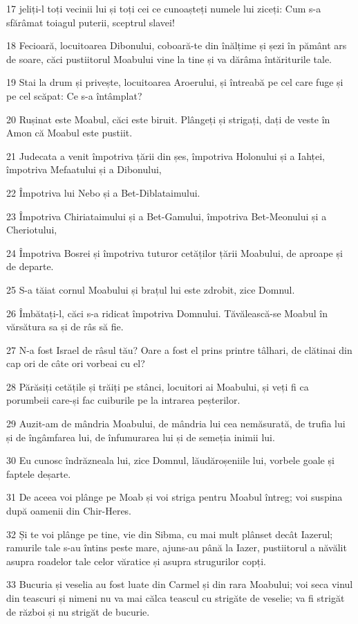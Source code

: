 \par 17 jeliți-l toți vecinii lui și toți cei ce cunoașteți numele lui ziceți: Cum s-a sfărâmat toiagul puterii, sceptrul slavei!
\par 18 Fecioară, locuitoarea Dibonului, coboară-te din înălțime și șezi în pământ ars de soare, căci pustiitorul Moabului vine la tine și va dărâma întăriturile tale.
\par 19 Stai la drum și privește, locuitoarea Aroerului, și întreabă pe cel care fuge și pe cel scăpat: Ce s-a întâmplat?
\par 20 Rușinat este Moabul, căci este biruit. Plângeți și strigați, dați de veste în Amon că Moabul este pustiit.
\par 21 Judecata a venit împotriva țării din șes, împotriva Holonului și a Iahței, împotriva Mefaatului și a Dibonului,
\par 22 Împotriva lui Nebo și a Bet-Diblataimului.
\par 23 Împotriva Chiriataimului și a Bet-Gamului, împotriva Bet-Meonului și a Cheriotului,
\par 24 Împotriva Bosrei și împotriva tuturor cetăților țării Moabului, de aproape și de departe.
\par 25 S-a tăiat cornul Moabului și brațul lui este zdrobit, zice Domnul.
\par 26 Îmbătați-l, căci s-a ridicat împotriva Domnului. Tăvălească-se Moabul în vărsătura sa și de râs să fie.
\par 27 N-a fost Israel de râsul tău? Oare a fost el prins printre tâlhari, de clătinai din cap ori de câte ori vorbeai cu el?
\par 28 Părăsiți cetățile și trăiți pe stânci, locuitori ai Moabului, și veți fi ca porumbeii care-și fac cuiburile pe la intrarea peșterilor.
\par 29 Auzit-am de mândria Moabului, de mândria lui cea nemăsurată, de trufia lui și de îngâmfarea lui, de înfumurarea lui și de semeția inimii lui.
\par 30 Eu cunosc îndrăzneala lui, zice Domnul, lăudăroșeniile lui, vorbele goale și faptele deșarte.
\par 31 De aceea voi plânge pe Moab și voi striga pentru Moabul întreg; voi suspina după oamenii din Chir-Heres.
\par 32 Și te voi plânge pe tine, vie din Sibma, cu mai mult plânset decât Iazerul; ramurile tale s-au întins peste mare, ajuns-au până la Iazer, pustiitorul a năvălit asupra roadelor tale celor văratice și asupra strugurilor copți.
\par 33 Bucuria și veselia au fost luate din Carmel și din rara Moabului; voi seca vinul din teascuri și nimeni nu va mai călca teascul cu strigăte de veselie; va fi strigăt de război și nu strigăt de bucurie.

